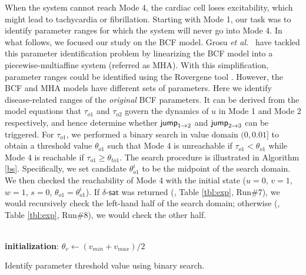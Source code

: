 When the system cannot reach Mode 4, the cardiac cell loses excitability, which might lead to tachycardia or fibrillation. Starting with Mode 1, our task was to identify parameter ranges for which the system will never go into Mode 4. In what follows, we focused our study on the BCF model.
Grosu {\em et al.}~\cite{grosu11} have tackled this parameter identification problem by linearizing the BCF model into a piecewise-multiaffine system (referred as MHA). With this simplification, parameter ranges could be identified using the Rovergene tool \cite{rovergene}. However, the BCF and MHA models have different sets of parameters. Here we identify disease-related ranges of the {\em original} BCF parameters. It can be derived from the model equations that $\tau_{o1}$ and $\tau_{o2}$ govern the dynamics of $u$ in Mode 1 and Mode 2 respectively, and hence determine whether $\mathsf{jump}_{1\rightarrow 2}$ and  $\mathsf{jump}_{2\rightarrow 3}$ can be triggered. For $\tau_{o1}$, we performed a binary search in value domain $(0,0.01]$ to obtain a threshold value $\theta_{o1}$ such that Mode 4 is unreachable if $\tau_{o1} < \theta_{o1}$ while Mode 4 is reachable if $\tau_{o1} \ge \theta_{to1}$. The search procedure is illustrated in Algorithm \ref{bs}. Specifically, we set candidate $\theta^i_{o1}$ to be the midpoint of the search domain. We then checked the reachability of Mode 4 with the initial state ($u = 0$, $v = 1$, $w = 1$, $s = 0$, $\theta_{o1} = \theta^i_{o1}$). If $\delta$-$\mathsf{sat}$ was returned (\eg, Table \ref{tbl:exp}, Run\#7), we would recursively check the left-hand half of the search domain; otherwise (\eg, Table \ref{tbl:exp}, Run\#8), we would check the other half.

\begin{algorithm}
\SetAlFnt{\tiny}
\SetAlCapFnt{\small}
\SetAlCapNameFnt{\small}
\SetAlgoLined
{}
\\
\textbf{initialization}: $\theta_{v} \leftarrow (v_{min}+v_{max})/2$\;
\caption{Identify parameter threshold value using binary search. \label{bs}}
\end{algorithm}



